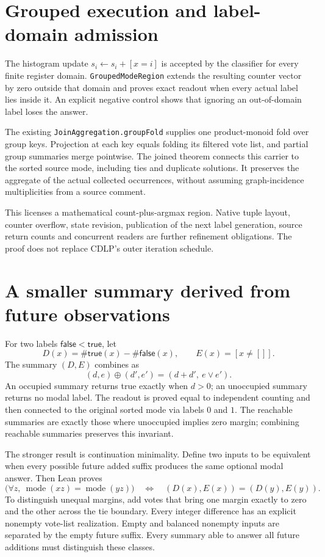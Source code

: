 \documentclass[11pt,a4paper]{article}
\newcommand{\code}[1]{\nolinkurl{#1}}
\begin{document}
\section{Grouped execution and label-domain admission}

The histogram update $s_i\gets s_i+[x=i]$ is accepted by the classifier for
every finite register domain. \code{GroupedModeRegion} extends the resulting
counter vector by zero outside that domain and proves exact readout when
every actual label lies inside it. An explicit negative control shows that
ignoring an out-of-domain label loses the answer.

The existing \code{JoinAggregation.groupFold} supplies one product-monoid fold
over group keys. Projection at each key equals folding its filtered vote list,
and partial group summaries merge pointwise. The joined theorem connects this
carrier to the sorted source mode, including ties and duplicate solutions.
It preserves the aggregate of the actual collected occurrences, without
assuming graph-incidence multiplicities from a source comment.

This licenses a mathematical count-plus-argmax region. Native tuple layout,
counter overflow, state revision, publication of the next label generation,
source return counts and concurrent readers are further refinement obligations.
The proof does not replace CDLP's outer iteration schedule.

\section{A smaller summary derived from future observations}

For two labels $\mathsf{false}<\mathsf{true}$, let
\[
 D(x)=\#\mathsf{true}(x)-\#\mathsf{false}(x),\qquad
 E(x)=[x\ne[]].
\]
The summary $(D,E)$ combines as
\[
 (d,e)\oplus(d',e')=(d+d',\ e\lor e').
\]
An occupied summary returns true exactly when $d>0$; an unoccupied summary
returns no modal label. The readout is proved equal to independent counting
and then connected to the original sorted mode via labels $0$ and $1$.
The reachable summaries are exactly those where unoccupied implies zero
margin; combining reachable summaries preserves this invariant.

The stronger result is continuation minimality. Define two inputs to be
equivalent when every possible future added suffix produces the same optional
modal answer. Then Lean proves
\[
 \bigl(\forall z,\ \operatorname{mode}(xz)=\operatorname{mode}(yz)\bigr)
 \quad\Longleftrightarrow\quad (D(x),E(x))=(D(y),E(y)).
\]
To distinguish unequal margins, add votes that bring one margin exactly to
zero and the other across the tie boundary. Every integer difference has an
explicit nonempty vote-list realization. Empty and balanced nonempty inputs
are separated by the empty future suffix. Every summary able to answer all
future additions must distinguish these classes.
\end{document}
